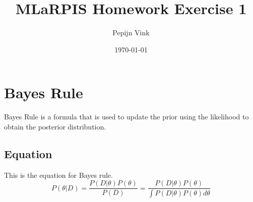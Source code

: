 \documentclass[10pt, fullpage, a4paper, titlepage]{article}
\title{MLaRPIS Homework Exercise 1}
\author{Pepijn Vink}
\date{\today}
\begin{document}
\maketitle
\newpage

\section{Bayes Rule}
Bayes Rule is a formula that is used to update the prior using the likelihood to obtain the posterior distribution.
\subsection{Equation}
This is the equation for Bayes rule.
\begin{equation}
    P( \theta|D ) = \frac{P(D|\theta) P(\theta)}{P(D)} = \frac{P(D|\theta) P(\theta)}{\int P(D | \theta) P(\theta) d\theta} 
\end{equation}
\end{document}
